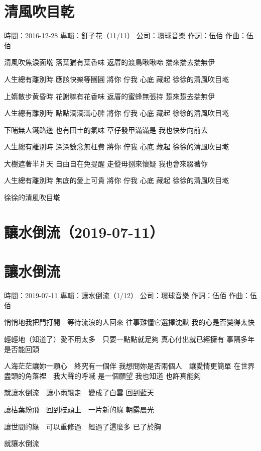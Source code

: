 \documentclass[UTF8,a4paper,oneside,twocolumn,12pt]{ctexbook}
\newcommand{\infopair}[2]{\textbullet #1：#2}
\newcommand{\zc}[1][伍佰]{\infopair{作詞}{#1}}
\newcommand{\zq}[1][伍佰]{\infopair{作曲}{#1}}
\newcommand{\zj}[1]{\infopair{專輯}{#1}}
\newcommand{\sj}[1]{\infopair{時間}{#1}}
\newcommand{\gs}[1]{\infopair{公司}{#1}}
\newenvironment{info}{\begin{flushleft}\kaishu
	}
	{\end{flushleft}\normalsize\yahei\par}
\newenvironment{lyric}{
	}
{}
\begin{document}
\section{清風吹目乾}
\begin{info}
	\sj{2016-12-28}
	\zj{釘子花（11/11）}
	\gs{環球音樂}
	\zc
	\zq
\end{info}
\begin{lyric}
	清風吹焦淚面墘
	落葉猶有葉香味
	返厝的渡鳥啾啾啼
	揣來揣去揣無伊

	人生總有離別時
	應該快樂等團圓
	將你 佇我 心底 藏起
	徐徐的清風吹目墘

	上媠散步黄昏時
	花謝嘛有花香味
	返厝的蜜蜂無張持
	踅來踅去揣無伊

	人生總有離別時
	點點滴滴滿心脾
	將你 佇我 心底 藏起
	徐徐的清風吹目墘

	下晡無人鐵路邊
	也有田土的氣味
	草仔發甲滿滿是
	我也快步向前去

	人生總有離別時
	深深數念無枉費
	將你 佇我 心底 藏起
	徐徐的清風吹目墘

	大樹遮著半爿天
	自由自在免提醒
	走傱毋捌來懷疑
	我也會來綴著你

	人生總有離別時
	無底的愛上可貴
	將你 佇我 心底 藏起
	徐徐的清風吹目墘

	徐徐的清風吹目墘
\end{lyric}

\section*{讓水倒流（2019-07-11）}
\section{讓水倒流}
\begin{info}
	\sj{2019-07-11}
	\zj{讓水倒流（1/12）}
	\gs{環球音樂}
	\zc
	\zq
\end{info}
\begin{lyric}
	悄悄地我把門打開　等待流浪的人回來
	往事難懂它選擇沈默
	我的心是否變得太快

	輕輕地（知道了）愛不用太多　只要一點點就足夠
	真心付出就已經擁有
	事隔多年是否能回頭

	人海茫茫讓妳一顆心　終究有一個伴
	我想問妳是否兩個人　讓愛情更簡單
	在世界盡頭的角落裡　我大聲的呼喊
	是一個願望 我也知道 也許真能夠

	就讓水倒流　讓小雨飄走　變成了白雲
	回到藍天

	讓枯葉紛飛　回到枝頭上　一片新的綠
	朝露晨光

	讓世間的緣　可以重修過　經過了這麼多
	已了於胸

	就讓水倒流
\end{lyric}
\end{document}
